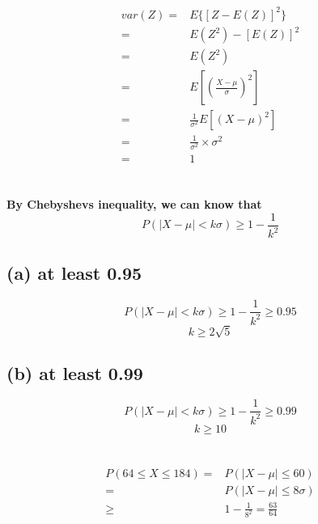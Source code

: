 \documentclass{article}
\begin{document}
            \begin{equation*}
                \begin{split}
                    var(Z)=&E\{[Z-E(Z)]^2\}\\
                        =&E(Z^2)-[E(Z)]^2\\
                        =&E(Z^2)\\
                        =&E[(\frac{X-\mu}{\sigma} )^2]\\
                        =&\frac{1}{\sigma^2}E[(X-\mu)^2]\\
                        =&\frac{1}{\sigma^2}\times \sigma^2\\
                        =&1
                \end{split}
            \end{equation*}
    
    \section{}
        \paragraph{
            By Chebyshevs inequality, we can know that
            $$P(|X-\mu|<k\sigma)\geq 1-\frac{1}{k^2}$$
        }

        \subsection*{(a) at least 0.95}
            $$P(|X-\mu|<k\sigma)\geq 1-\frac{1}{k^2}\geq0.95$$
            $$k\geq 2\sqrt{5}$$
        
        \subsection*{(b) at least 0.99}
            $$P(|X-\mu|<k\sigma)\geq 1-\frac{1}{k^2}\geq0.99$$
            $$k\geq 10$$
    
    \section{}
  
            \begin{equation*}
                \begin{split}
                    P(64\leq X\leq 184)=&P(|X-\mu|\leq 60)\\
                        =&P(|X-\mu|\leq 8\sigma)\\
                        \geq&1-\frac{1}{8^2}=\frac{63}{64}
                \end{split}
            \end{equation*}
    
\end{document}
